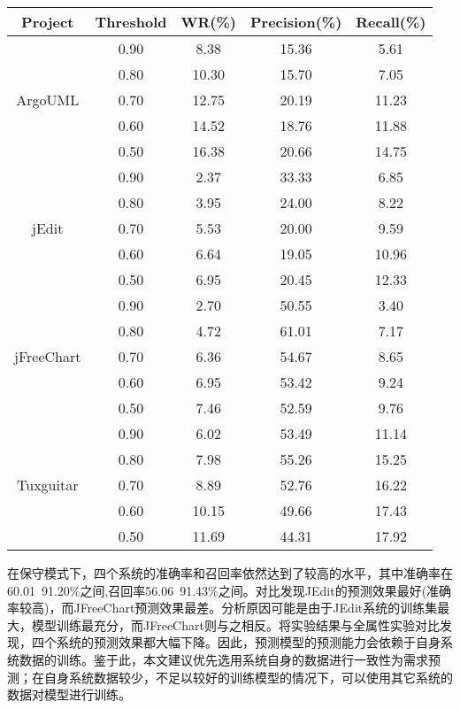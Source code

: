 \begin{table}[htbp]
\vspace{0.5em}\centering\wuhao
\begin{tabular}{ccccc}
\toprule[1.5pt]
\textbf{Project}&\textbf{Threshold}&\textbf{WR(\%)}&\textbf{Precision(\%)}&\textbf{Recall(\%)}\\
\midrule[1pt]
\multirow{5}{*}{ArgoUML}
&0.90&	8.38&	15.36&	5.61\\
&0.80&	10.30&	15.70&	7.05\\
&0.70&	12.75&	20.19&	11.23\\
&0.60&	14.52&	18.76&	11.88\\
&0.50&	16.38&	20.66&	14.75\\

\multirow{5}{*}{jEdit}
&0.90&	2.37&	33.33&	6.85\\
&0.80&	3.95&	24.00&	8.22\\
&0.70&	5.53&	20.00&	9.59\\
&0.60&	6.64&	19.05&	10.96\\
&0.50&	6.95&	20.45&	12.33\\

\multirow{5}{*}{jFreeChart}
&0.90&	2.70&	50.55&	3.40\\
&0.80&	4.72&	61.01&	7.17\\
&0.70&	6.36&	54.67&	8.65\\
&0.60&	6.95&	53.42&	9.24\\
&0.50&	7.46&	52.59&	9.76\\

\multirow{5}{*}{Tuxguitar}
&0.90&	6.02&	53.49&	11.14\\
&0.80&	7.98&	55.26&	15.25\\
&0.70&	8.89&	52.76&	16.22\\
&0.60&	10.15&	49.66&	17.43\\
&0.50&	11.69&	44.31&	17.92\\
\bottomrule[1.5pt]
\end{tabular}
\end{table}

在保守模式下，四个系统的准确率和召回率依然达到了较高的水平，其中准确率在60.01~91.20\%之间,召回率56.06~91.43\%之间。对比发现JEdit的预测效果最好(准确率较高)，而JFreeChart预测效果最差。分析原因可能是由于JEdit系统的训练集最大，模型训练最充分，而JFreeChart则与之相反。将实验结果与全属性实验对比发现，四个系统的预测效果都大幅下降。因此，预测模型的预测能力会依赖于自身系统数据的训练。鉴于此，本文建议优先选用系统自身的数据进行一致性为需求预测；在自身系统数据较少，不足以较好的训练模型的情况下，可以使用其它系统的数据对模型进行训练。

